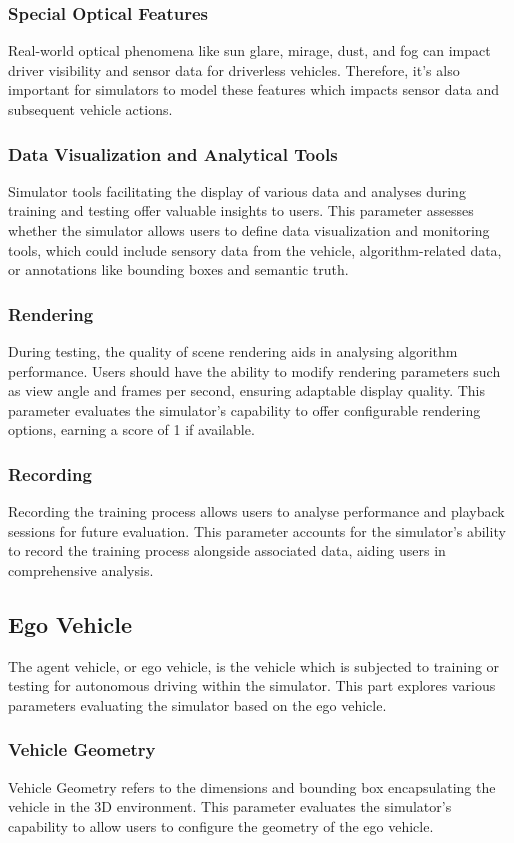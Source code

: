 \documentclass[12pt,twoside,a4paper,parskip]{scrbook} %
\begin{document}
\subsubsection{Special Optical Features}
Real-world optical phenomena like sun glare, mirage, dust, and fog can impact driver visibility and sensor data for driverless vehicles. Therefore, it's also important for simulators to model these features which impacts sensor data and subsequent vehicle actions.
\subsubsection{Data Visualization and Analytical Tools}
Simulator tools facilitating the display of various data and analyses during training and testing offer valuable insights to users. This parameter assesses whether the simulator allows users to define data visualization and monitoring tools, which could include sensory data from the vehicle, algorithm-related data, or annotations like bounding boxes and semantic truth.
\subsubsection{Rendering}
During testing, the quality of scene rendering aids in analysing algorithm performance. Users should have the ability to modify rendering parameters such as view angle and frames per second, ensuring adaptable display quality. This parameter evaluates the simulator's capability to offer configurable rendering options, earning a score of 1 if available.
\subsubsection{Recording}
Recording the training process allows users to analyse performance and playback sessions for future evaluation. This parameter accounts for the simulator's ability to record the training process alongside associated data, aiding users in comprehensive analysis.

\subsection{Ego Vehicle}
The agent vehicle, or ego vehicle, is the vehicle which is subjected to training or testing for autonomous driving within the simulator. This part explores various parameters evaluating the simulator based on the ego vehicle.

\subsubsection{Vehicle Geometry}
Vehicle Geometry refers to the dimensions and bounding box encapsulating the vehicle in the 3D environment. This parameter evaluates the simulator's capability to allow users to configure the geometry of the ego vehicle.
\end{document}
